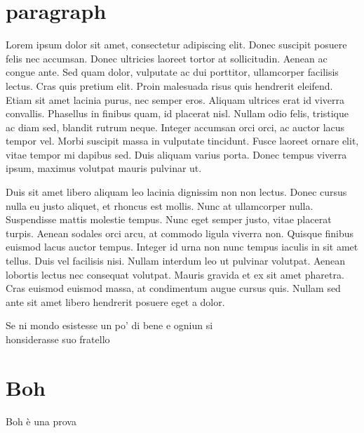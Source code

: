 
\section{paragraph}
Lorem ipsum dolor sit amet, consectetur adipiscing elit. Donec suscipit posuere felis nec accumsan. Donec ultricies laoreet tortor at sollicitudin. Aenean ac congue ante. Sed quam dolor, vulputate ac dui porttitor, ullamcorper facilisis lectus. Cras quis pretium elit. Proin malesuada risus quis hendrerit eleifend. Etiam sit amet lacinia purus, nec semper eros. Aliquam ultrices erat id viverra convallis. Phasellus in finibus quam, id placerat nisl. Nullam odio felis, tristique ac diam sed, blandit rutrum neque. Integer accumsan orci orci, ac auctor lacus tempor vel. Morbi suscipit massa in vulputate tincidunt. Fusce laoreet ornare elit, vitae tempor mi dapibus sed. Duis aliquam varius porta. Donec tempus viverra ipsum, maximus volutpat mauris pulvinar ut.

Duis sit amet libero aliquam leo lacinia dignissim non non lectus. Donec cursus nulla eu justo aliquet, et rhoncus est mollis. Nunc at ullamcorper nulla. Suspendisse mattis molestie tempus. Nunc eget semper justo, vitae placerat turpis. Aenean sodales orci arcu, at commodo ligula viverra non. Quisque finibus euismod lacus auctor tempus. Integer id urna non nunc tempus iaculis in sit amet tellus. Duis vel facilisis nisi. Nullam interdum leo ut pulvinar volutpat. Aenean lobortis lectus nec consequat volutpat. Mauris gravida et ex sit amet pharetra. Cras euismod euismod massa, at condimentum augue cursus quis. Nullam sed ante sit amet libero hendrerit posuere eget a dolor. 

Se ni mondo esistesse un po' di bene e ogniun si \\honsiderasse suo 
fratello

\section{Boh}
Boh è una prova